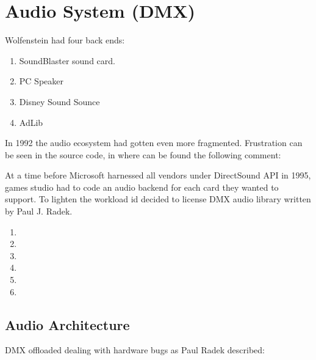 \section{Audio System (DMX)}


Wolfenstein had four back ends:
\begin{enumerate}
\item SoundBlaster sound card.
\item PC Speaker
\item Disney Sound Sounce
\item AdLib
\end{enumerate}

In 1992 the audio ecosystem had gotten even more fragmented. Frustration can be seen in the source code, in  where can be found the following comment:\\
\par
{}
\par
At a time before Microsoft harnessed all vendors under DirectSound API in 1995, games studio had to code an audio backend for each card they wanted to support. To lighten the workload id decided to license DMX audio library written by Paul J. Radek.\\
\par
\begin{enumerate}
\item 
\item 
\item 
\item 
\item 
\item 
\end{enumerate}

\subsection{Audio Architecture}
DMX offloaded dealing with hardware bugs as Paul Radek described:

